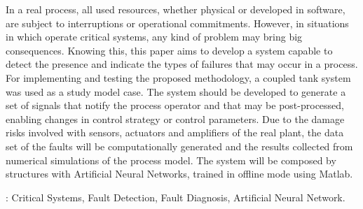 In a real process, all used resources, whether physical or developed in
software, are subject to interruptions or operational commitments. However, in
situations in which operate critical systems, any kind of problem may bring big
consequences. Knowing this, this paper aims to develop a system capable to
detect the presence and indicate the types of failures that may occur in a
process. For implementing and testing the proposed methodology, a
coupled tank system was used as a study model case. The system should be
developed to generate a set of signals that notify the process operator and that
may be post-processed, enabling changes in control strategy or control
parameters. Due to the damage risks involved with sensors, actuators and
amplifiers of the real plant, the data set of the faults will be computationally
generated and the results collected from numerical simulations of the
process model. The system will be composed by structures with Artificial Neural
Networks, trained in offline mode using Matlab\reg.

\vspace{1.5ex}

: Critical Systems, Fault Detection, Fault Diagnosis,
Artificial Neural Network.
